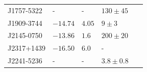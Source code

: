 \begin{table}
\begin{center}
\begin{tabular}{lllll}
J1757-5322 & -        & -      & $130 \pm 45$   & ~\cite{ParthasarathyEtAl:2021}\\
J1909-3744 & $-14.74$ & $4.05$ &   $9 \pm  3$   & ~\cite{GoncharovEtAl:2021,ParthasarathyEtAl:2021}\\ 
J2145-0750 & $-13.86$ & $1.6$  & $200 \pm 20$   & ~\cite{NANOGrav12p5yr:2021,ParthasarathyEtAl:2021}\\ 
J2317+1439 & $-16.50$ & $6.0$  & -              & ~\cite{NANOGrav12p5yr:2021}\\
J2241-5236 & -        & -      & $3.8 \pm  0.8$ & ~\cite{ParthasarathyEtAl:2021}\\
\hline\hline
\end{tabular}
\end{center}
\end{table}

